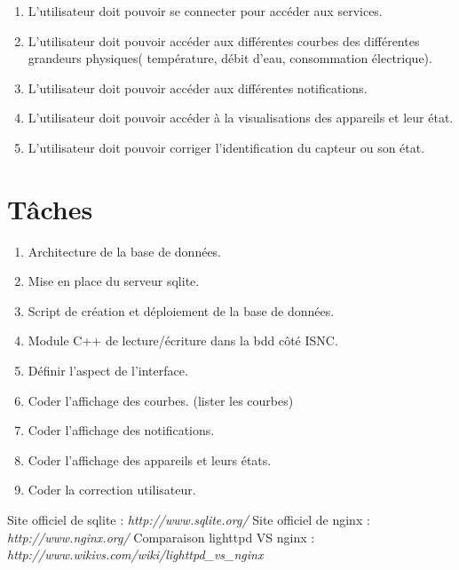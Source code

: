 \documentclass[10pt,a4paper]{article}
\begin{document}
\begin{enumerate}[label=\bfseries US\arabic* :]
    \item L'utilisateur doit pouvoir se connecter pour accéder aux services.
    \item L'utilisateur doit pouvoir accéder aux différentes courbes des différentes grandeurs physiques( température, débit d'eau, consommation électrique).
    \item L'utilisateur doit pouvoir accéder aux différentes notifications.
    \item L'utilisateur doit pouvoir accéder à la visualisations des appareils et leur état.
    \item L'utilisateur doit pouvoir corriger l'identification du capteur ou son état.
\end{enumerate}

\section{Tâches}

\begin{enumerate}[label=\bfseries\Alph* :]
    \item Architecture de la base de données.
    \item Mise en place du serveur sqlite.
    \item Script de création et déploiement de la base de données.
    \item Module C++ de lecture/écriture dans la bdd côté ISNC.
    \item Définir l'aspect de l'interface.
    \item Coder l'affichage des courbes. (lister les courbes)
    \item Coder l'affichage des notifications. 
    \item Coder l'affichage des appareils et leurs états.
    \item Coder la correction utilisateur.
\end{enumerate}


\begin{thebibliography}{10}
    Site officiel de sqlite : \emph{http://www.sqlite.org/}
    Site officiel de nginx : \emph{http://www.nginx.org/}
    Comparaison lighttpd VS nginx :  \emph{http://www.wikivs.com/wiki/lighttpd\_vs\_nginx}
\end{thebibliography}
\end{document}
